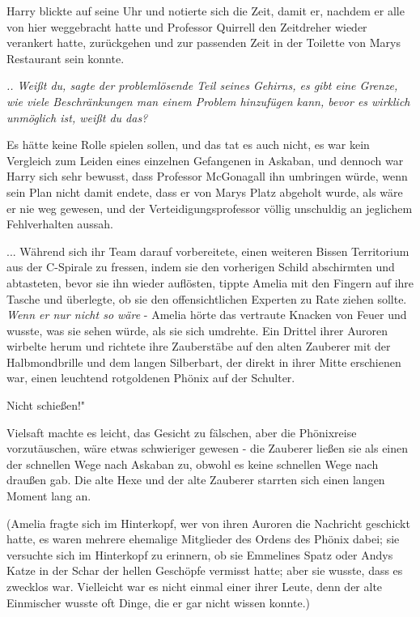 Harry blickte auf seine Uhr und notierte sich die Zeit, damit er, nachdem er
alle von hier weggebracht hatte und Professor Quirrell den Zeitdreher wieder
verankert hatte, zurückgehen und zur passenden Zeit in der Toilette von Marys
Restaurant sein konnte.

\emph{.. Weißt du, sagte der problemlösende Teil seines Gehirns, es gibt eine
Grenze, wie viele Beschränkungen man einem Problem hinzufügen kann, bevor es
wirklich unmöglich ist, weißt du das?}

Es hätte keine Rolle spielen sollen, und das tat es auch nicht, es war kein
Vergleich zum Leiden eines einzelnen Gefangenen in Askaban, und dennoch war
Harry sich sehr bewusst, dass Professor McGonagall ihn umbringen würde, wenn
sein Plan nicht damit endete, dass er von Marys Platz abgeholt wurde, als wäre
er nie weg gewesen, und der Verteidigungsprofessor völlig unschuldig an
jeglichem Fehlverhalten aussah.

... Während sich ihr Team darauf vorbereitete, einen weiteren Bissen Territorium
aus der C-Spirale zu fressen, indem sie den vorherigen Schild abschirmten und
abtasteten, bevor sie ihn wieder auflösten, tippte Amelia mit den Fingern auf
ihre Tasche und überlegte, ob sie den offensichtlichen Experten zu Rate ziehen
sollte. \emph{Wenn er nur nicht so wäre} - Amelia hörte das vertraute Knacken
von Feuer und wusste, was sie sehen würde, als sie sich umdrehte. Ein Drittel
ihrer Auroren wirbelte herum und richtete ihre Zauberstäbe auf den alten
Zauberer mit der Halbmondbrille und dem langen Silberbart, der direkt in ihrer
Mitte erschienen war, einen leuchtend rotgoldenen Phönix auf der Schulter.

\glqq{}Nicht schießen!"

Vielsaft machte es leicht, das Gesicht zu fälschen, aber die Phönixreise
vorzutäuschen, wäre etwas schwieriger gewesen - die Zauberer ließen sie als
einen der schnellen Wege nach Askaban zu, obwohl es keine schnellen Wege nach
draußen gab. Die alte Hexe und der alte Zauberer starrten sich einen langen
Moment lang an.

(Amelia fragte sich im Hinterkopf, wer von ihren Auroren die Nachricht geschickt
hatte, es waren mehrere ehemalige Mitglieder des Ordens des Phönix dabei; sie
versuchte sich im Hinterkopf zu erinnern, ob sie Emmelines Spatz oder Andys
Katze in der Schar der hellen Geschöpfe vermisst hatte; aber sie wusste, dass es
zwecklos war. Vielleicht war es nicht einmal einer ihrer Leute, denn der alte
Einmischer wusste oft Dinge, die er gar nicht wissen konnte.)

